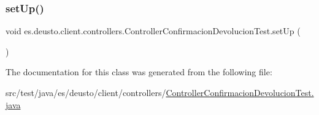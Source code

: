 \mbox{\label{classes_1_1deusto_1_1client_1_1controllers_1_1_controller_confirmacion_devolucion_test_aa5d47a6e8c3aeb20f2624a8e5681ba63}} 
\subsubsection{\texorpdfstring{setUp()}{setUp()}}
{\footnotesize\ttfamily void es.\+deusto.\+client.\+controllers.\+Controller\+Confirmacion\+Devolucion\+Test.\+set\+Up (\begin{DoxyParamCaption}{ }\end{DoxyParamCaption})}



The documentation for this class was generated from the following file\+:\begin{DoxyCompactItemize}
\item 
src/test/java/es/deusto/client/controllers/\mbox{\hyperlink{_controller_confirmacion_devolucion_test_8java}{Controller\+Confirmacion\+Devolucion\+Test.\+java}}\end{DoxyCompactItemize}
